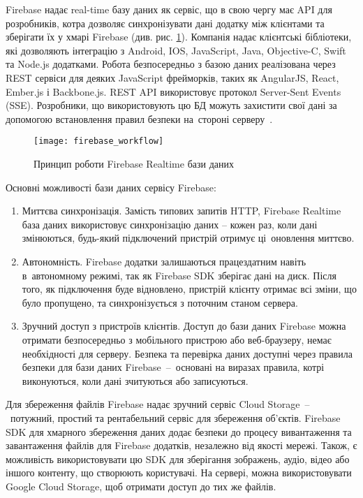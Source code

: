 \documentclass[../main.tex]{subfiles}
\begin{document}
Firebase надає real-time базу даних як сервіс, що в свою чергу має API для розробників, котра дозволяє синхронізувати дані додатку між клієнтами та зберігати їх у хмарі Firebase (див. рис. \ref{figure:firebase_workflow}). Компанія надає клієнтські бібліотеки, які дозволяють інтеграцію з Android, IOS, JavaScript, Java, Objective-C, Swift та Node.js додатками. Робота безпосередньо з базою даних реалізована через REST сервіси для деяких JavaScript фрейморків, таких як AngularJS, React, Ember.js і Backbone.js. REST API використовує протокол Server-Sent Events (SSE). Розробники, що використовують цю БД можуть захистити свої дані за допомогою встановлення правил безпеки на~стороні серверу~\cite{firebase_secure}.

\begin{figure}[H]
	\centering
	\texttt{[image: firebase\_workflow]}
	\caption{Принцип роботи Firebase Realtime бази даних}
	\label{figure:firebase_workflow}
\end{figure}

Основні можливості бази даних сервісу Firebase:
\begin{enumerate}
	\item Миттєва синхронізація. Замість типових запитів HTTP, Firebase Realtime база даних використовує синхронізацію даних -- кожен раз, коли дані змінюються, будь-який підключений пристрій отримує ці~оновлення миттєво.
	\item Автономність. Firebase додатки залишаються працездатним навіть в~автономному режимі, так як Firebase SDK зберігає дані на диск. Після того, як підключення буде відновлено, пристрій клієнту отримає всі зміни, що було пропущено, та синхронізується з поточним станом сервера.
	\item Зручний доступ з пристроїв клієнтів. Доступ до бази даних Firebase можна отримати безпосередньо з мобільного пристрою або веб-браузеру, немає необхідності для серверу. Безпека та перевірка даних доступні через правила безпеки для бази даних Firebase~--~основані на виразах правила, котрі виконуються, коли дані зчитуються або записуються.
\end{enumerate}

Для збереження файлів Firebase надає зручний сервіс Cloud Storage~--~потужний, простий та рентабельний сервіс для збереження об'єктів. Firebase SDK для хмарного збереження даних додає безпеки до процесу вивантаження та завантаження файлів для Firebase додатків, незалежно від якості мережі. Також, є можливість використовувати цю SDK для зберігання зображень, аудіо, відео або іншого контенту, що створюють користувачі. На сервері, можна використовувати Google Cloud Storage, щоб отримати доступ до тих же файлів.
\end{document}
